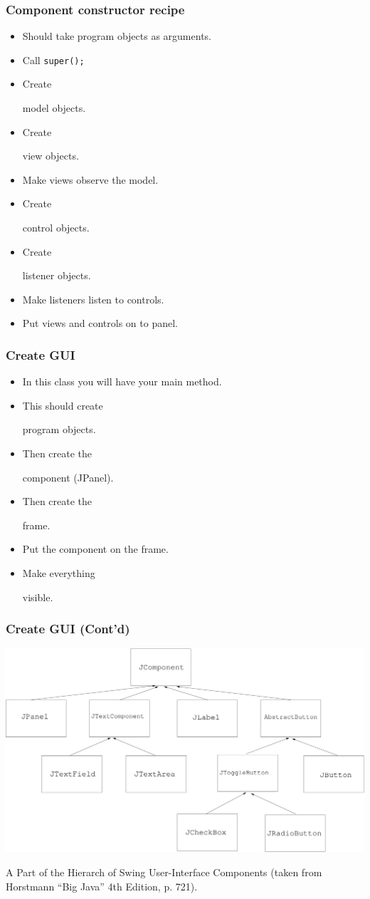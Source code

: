 \documentclass{beamer}
\def\mcolor#1#2{\rule{0ex}{0ex}\color{#1}#2\color{black}{}}
\begin{document}
\begin{frame}
  \frametitle{Component constructor recipe}
\begin{itemize}
\item Should take program objects as arguments.  
\item Call \texttt{super();}
\item Create \mcolor{blue}{model objects}.
\item Create \mcolor{blue}{view objects}.
\item \mcolor{blue}{Make views observe the model.}
\item Create \mcolor{blue}{control} objects.
\item Create \mcolor{blue}{listener} objects.
\item \mcolor{blue}{Make listeners listen to controls.}
\item \mcolor{blue}{Put views and controls on to panel.}
\end{itemize}
\end{frame}

\begin{frame}
  \frametitle{Create GUI}
\begin{itemize}
\item In this class you will have your main method.
\item This should create \mcolor{blue}{program objects}.
\item Then create the \mcolor{blue}{component} (JPanel).
\item Then create the \mcolor{blue}{frame}.
\item \mcolor{blue}{Put the component on the frame.}
\item Make everything \mcolor{blue}{visible}.
\end{itemize}
\end{frame}

\begin{frame}
  \frametitle{Create GUI (Cont'd)}
\begin{center}
\includegraphics[width=1\textwidth]{./swingHierarchy.pdf}
\end{center}

A Part of the Hierarch of Swing User-Interface Components (taken from Horstmann ``Big Java'' 4th Edition, p. 721).
\end{frame}
\end{document}
